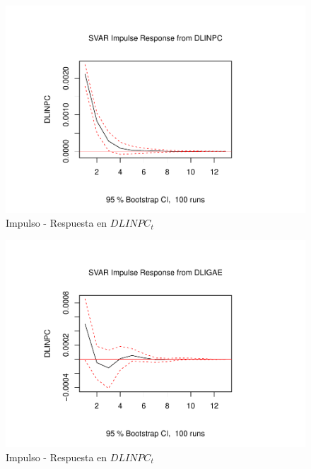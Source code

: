\documentclass[
]{book}
\begin{document}
\begin{figure}

{\centering \includegraphics{Notas-Series-Tiempo_files/figure-latex/fig65-1} 

}

\caption{Impulso - Respuesta en $DLINPC_t$}\label{fig:fig65-1}
\end{figure}
\begin{figure}

{\centering \includegraphics{Notas-Series-Tiempo_files/figure-latex/fig65-2} 

}

\caption{Impulso - Respuesta en $DLINPC_t$}\label{fig:fig65-2}
\end{figure}
\end{document}
